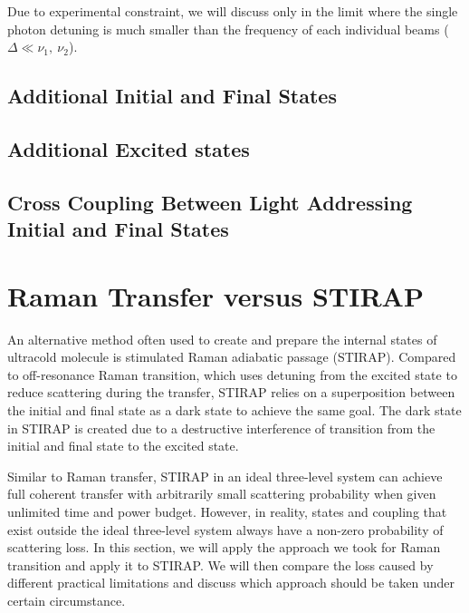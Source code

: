 \todo{}

Due to experimental constraint,
we will discuss only in the limit where the single photon detuning is
much smaller than the frequency of each individual beams ($\Delta\ll\nu_1,\ \nu_2$).

\subsection{Additional Initial and Final States}

\subsection{Additional Excited states}

\subsection{Cross Coupling Between Light Addressing Initial and Final States}


\section{Raman Transfer versus STIRAP}

An alternative method often used to create and prepare the internal states of ultracold molecule
is stimulated Raman adiabatic passage (STIRAP)\todo{\cite{}}.
Compared to off-resonance Raman transition, which uses detuning from the excited state
to reduce scattering during the transfer, STIRAP relies on a superposition between
the initial and final state as a dark state to achieve the same goal.
The dark state in STIRAP is created due to a destructive interference of transition
from the initial and final state to the excited state.

Similar to Raman transfer, STIRAP in an ideal three-level system can achieve
full coherent transfer with arbitrarily small scattering probability
when given unlimited time and power budget.
However, in reality, states and coupling that exist outside the ideal three-level system
always have a non-zero probability of scattering loss.
In this section, we will apply the approach we took for Raman transition
and apply it to STIRAP. We will then compare the loss caused by different practical limitations
and discuss which approach should be taken under certain circumstance.


